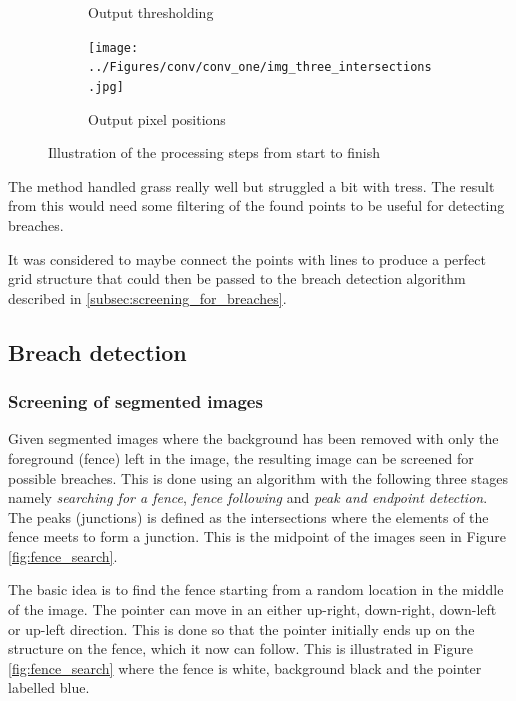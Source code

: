 \documentclass[../Head/Main.tex]{subfiles}
\begin{document}
\begin{figure}[H]
\begin{subfigure}{0.24\textwidth}
        \caption{Output thresholding}
        \label{fig:conv_tst1_thresh}
    \end{subfigure}
    \hfill
    \begin{subfigure}{0.24\textwidth}
        \centering
        \texttt{[image: ../Figures/conv/conv\_one/img\_three\_intersections.jpg]}
        \caption{Output pixel positions}
        \label{fig:conv_tst1_px_pos}
    \end{subfigure}
    \caption{Illustration of the processing steps from start to finish}
    \label{fig:conv_tst1}
\end{figure}
\vspace{-15pt}
The method handled grass really well but struggled a bit with tress. The result from this would need some filtering of the found points to be useful for detecting breaches.\par
It was considered to maybe connect the points with lines to produce a perfect grid structure that could then be passed to the breach detection algorithm described in \autoref{subsec:screening_for_breaches}.

\subsection{Breach detection}

\subsubsection{Screening of segmented images}
\label{subsec:screening_for_breaches}

Given segmented images where the background has been removed with only the foreground (fence) left in the image, the resulting image can be screened for possible breaches. This is done using an algorithm with the following three stages namely \textit{searching for a fence}, \textit{fence following} and \textit{peak and endpoint detection}. The peaks (junctions) is defined as the intersections where the elements of the fence meets to form a junction. This is the midpoint of the images seen in Figure \ref{fig:fence_search}. 

The basic idea is to find the fence starting from a random location in the middle of the image. The pointer can move in an either up-right, down-right, down-left or up-left direction. This is done so that the pointer initially ends up on the structure on the fence, which it now can follow. This is illustrated in Figure \ref{fig:fence_search} where the fence is white, background black and the pointer labelled blue.    
\end{document}
